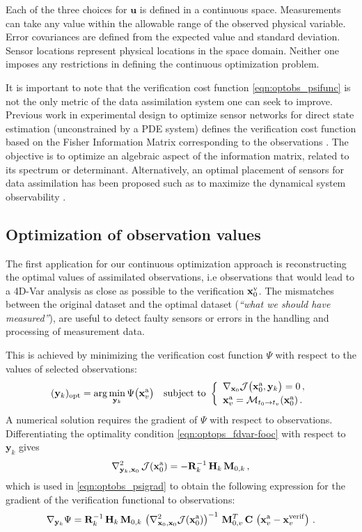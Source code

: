 \documentclass{article}
\newcommand{\Jfunc}{\mathcal J }
\newcommand{\Model}{\mathcal M}
\newcommand{\M}{\mathbf{M}}
\newcommand{\HH}{\mathbf H}
\newcommand{\C}{\mathbf{C}}
\newcommand{\R}{\mathbf{R}}
\newcommand{\x}{   \mathbf{x} }
\newcommand{\xa}{ \mathbf{x}^{\rm a} }
\newcommand{\xv}{ \mathbf{x}^{\rm v} }
\newcommand{\y}{ \mathbf{y} }
\renewcommand{\u}{ \mathbf{u} }
\begin{document}
Each of the three choices for $\u$ is defined in a continuous space.
Measurements can take any value within the allowable range of the observed physical variable.
Error covariances are defined from the expected value and standard deviation.
Sensor locations represent physical locations in the space domain.
Neither one imposes any restrictions in defining the continuous optimization problem.

It is important to note that the verification cost function \eqref{eqn:optobs_psifunc} is not the only metric of the data assimilation system 
one can seek to improve.
Previous work in experimental design to optimize sensor networks for direct state estimation 
(unconstrained by a PDE system) defines the verification cost function based on the Fisher Information Matrix
corresponding to the observations \cite{ucinski2000optimal}. The objective is to optimize
an algebraic aspect of the information matrix, related to its spectrum or determinant.
Alternatively, an optimal placement of sensors for data assimilation has been proposed
such as to maximize the dynamical system observability \cite{TELLUSA17133}.

\subsection{Optimization of observation values}\label{sec:optimize-values}


The first application for our continuous optimization approach is reconstructing
the optimal values of assimilated observations, i.e observations that would lead
to a 4D-Var analysis as close as possible to the verification $\xv_0$.
The mismatches 
between the original dataset and the optimal dataset (\textit{``what we should have measured''}),
are useful to detect faulty sensors or errors in the handling and processing of measurement data.

This is achieved by minimizing the verification cost function $\Psi$ with respect 
to the values of selected observations:
\begin{equation}
 \label{eqn:optimal-y}
  (\y_k)_\textrm{opt} = \arg\min_{\y_k} \Psi\bigl(\xa_v\bigr) \quad \textnormal{subject to }
 \left\{ 
 \begin{array}{l}
 \nabla_{\x_0} \Jfunc\bigl(\xa_0,\y_k\bigr) = 0\,, \\[2pt]
 \xa_v = \Model_{t_0 \rightarrow t_v} (\xa_0)\,.
 \end{array}
 \right. 
\end{equation}
A numerical solution requires the gradient of $\Psi$ with respect to observations.
Differentiating the optimality condition \eqref{eqn:optops_fdvar-fooc} with respect to $\y_k$ gives
\[
\nabla_{\y_k, \x_0}^2 \, \Jfunc(\xa_0) = -\R_k^{-1} \, \HH_k \, \M_{0,k} \,,
\]
which is used in \eqref{eqn:optobs_psigrad} to obtain the following expression for the gradient of the verification functional to observations:
\[
 \nabla_{\y_k} \Psi = \R_k^{-1}\, \HH_k\, \M_{0,k}\, \left(\nabla_{\x_0,\x_0}^2 \Jfunc(\xa_0)\right) ^{-1} \, \M^T_{0,v} \, \C \, \left( \xa_v -\x^{\rm verif}_v \right)\,.
\]
\end{document}
